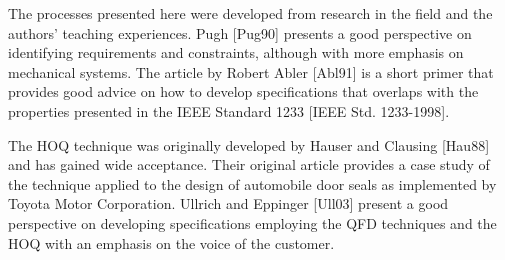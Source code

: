 The processes presented here were developed from research in the field
and the authors' teaching experiences. Pugh {[}Pug90{]} presents a good
perspective on identifying requirements and constraints, although with
more emphasis on mechanical systems. The article by Robert Abler
{[}Abl91{]} is a short primer that provides good advice on how to
develop specifications that overlaps with the properties presented in
the IEEE Standard 1233 {[}IEEE Std. 1233-1998{]}.

The HOQ technique was originally developed by Hauser and Clausing
{[}Hau88{]} and has gained wide acceptance. Their original article
provides a case study of the technique applied to the design of
automobile door seals as implemented by Toyota Motor Corporation.
Ullrich and Eppinger {[}Ull03{]} present a good perspective on
developing specifications employing the QFD techniques and the HOQ with
an emphasis on the voice of the customer.

